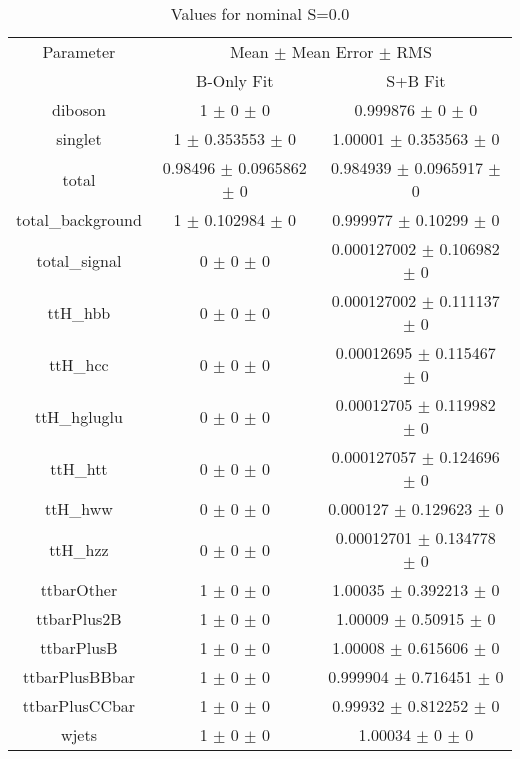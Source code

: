 \begin{table}
\centering
\caption{Values for nominal S=0.0}
\begin{tabular}{ccc}
\toprule
Parameter & \multicolumn{2}{c}{Mean $\pm$ Mean Error $\pm$ RMS}\\
 & B-Only Fit & S+B Fit\\
\midrule
diboson & \num{1} $\pm$ \num{0} $\pm$ \num{0} & \num{0.999876} $\pm$ \num{0} $\pm$ \num{0}\\
singlet & \num{1} $\pm$ \num{0.353553} $\pm$ \num{0} & \num{1.00001} $\pm$ \num{0.353563} $\pm$ \num{0}\\
total & \num{0.98496} $\pm$ \num{0.0965862} $\pm$ \num{0} & \num{0.984939} $\pm$ \num{0.0965917} $\pm$ \num{0}\\
total\_background & \num{1} $\pm$ \num{0.102984} $\pm$ \num{0} & \num{0.999977} $\pm$ \num{0.10299} $\pm$ \num{0}\\
total\_signal & \num{0} $\pm$ \num{0} $\pm$ \num{0} & \num{0.000127002} $\pm$ \num{0.106982} $\pm$ \num{0}\\
ttH\_hbb & \num{0} $\pm$ \num{0} $\pm$ \num{0} & \num{0.000127002} $\pm$ \num{0.111137} $\pm$ \num{0}\\
ttH\_hcc & \num{0} $\pm$ \num{0} $\pm$ \num{0} & \num{0.00012695} $\pm$ \num{0.115467} $\pm$ \num{0}\\
ttH\_hgluglu & \num{0} $\pm$ \num{0} $\pm$ \num{0} & \num{0.00012705} $\pm$ \num{0.119982} $\pm$ \num{0}\\
ttH\_htt & \num{0} $\pm$ \num{0} $\pm$ \num{0} & \num{0.000127057} $\pm$ \num{0.124696} $\pm$ \num{0}\\
ttH\_hww & \num{0} $\pm$ \num{0} $\pm$ \num{0} & \num{0.000127} $\pm$ \num{0.129623} $\pm$ \num{0}\\
ttH\_hzz & \num{0} $\pm$ \num{0} $\pm$ \num{0} & \num{0.00012701} $\pm$ \num{0.134778} $\pm$ \num{0}\\
ttbarOther & \num{1} $\pm$ \num{0} $\pm$ \num{0} & \num{1.00035} $\pm$ \num{0.392213} $\pm$ \num{0}\\
ttbarPlus2B & \num{1} $\pm$ \num{0} $\pm$ \num{0} & \num{1.00009} $\pm$ \num{0.50915} $\pm$ \num{0}\\
ttbarPlusB & \num{1} $\pm$ \num{0} $\pm$ \num{0} & \num{1.00008} $\pm$ \num{0.615606} $\pm$ \num{0}\\
ttbarPlusBBbar & \num{1} $\pm$ \num{0} $\pm$ \num{0} & \num{0.999904} $\pm$ \num{0.716451} $\pm$ \num{0}\\
ttbarPlusCCbar & \num{1} $\pm$ \num{0} $\pm$ \num{0} & \num{0.99932} $\pm$ \num{0.812252} $\pm$ \num{0}\\
wjets & \num{1} $\pm$ \num{0} $\pm$ \num{0} & \num{1.00034} $\pm$ \num{0} $\pm$ \num{0}\\
\bottomrule
\end{tabular}
\end{table}